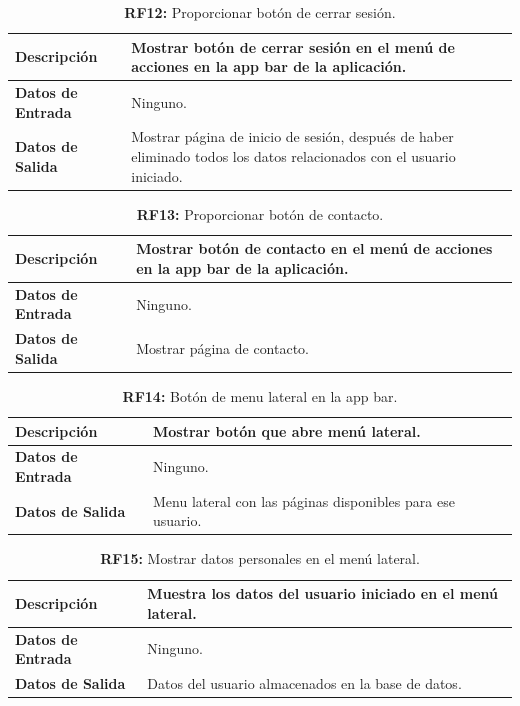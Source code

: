 \documentclass[a4paper, 12pt]{article}
\begin{document}
\begin{table}[H]
\captionsetup{justification=raggedright,singlelinecheck=false}
\caption{\textbf{RF12:} Proporcionar botón de cerrar sesión.}
\label{tab:RF12}
	\begin{tabular}{|m{5cm}|m{10cm}|}
	\hline
	\textbf{Descripción} & Mostrar botón de cerrar sesión en el menú de acciones en la app bar de la aplicación. \\ 
	\hline
	\textbf{Datos de Entrada} & Ninguno. \\ 
	\hline
	\textbf{Datos de Salida} & Mostrar página de inicio de sesión, después de haber eliminado todos los datos relacionados con el usuario iniciado. \\ 
	\hline
\end{tabular}
\end{table}

\begin{table}[H]
\captionsetup{justification=raggedright,singlelinecheck=false}
\caption{\textbf{RF13:} Proporcionar botón de contacto.}
\label{tab:RF13}
	\begin{tabular}{|m{5cm}|m{10cm}|}
	\hline
	\textbf{Descripción} & Mostrar botón de contacto en el menú de acciones en la app bar de la aplicación. \\ 
	\hline
	\textbf{Datos de Entrada} & Ninguno. \\ 
	\hline
	\textbf{Datos de Salida} & Mostrar página de contacto. \\ 
	\hline
\end{tabular}
\end{table}

\begin{table}[H]
\captionsetup{justification=raggedright,singlelinecheck=false}
\caption{\textbf{RF14:} Botón de menu lateral en la app bar.}
\label{tab:RF14}
	\begin{tabular}{|m{5cm}|m{10cm}|}
	\hline
	\textbf{Descripción} & Mostrar botón que abre menú lateral. \\ 
	\hline
	\textbf{Datos de Entrada} & Ninguno. \\ 
	\hline
	\textbf{Datos de Salida} & Menu lateral con las páginas disponibles para ese usuario. \\ 
	\hline
\end{tabular}
\end{table}

\begin{table}[H]
\captionsetup{justification=raggedright,singlelinecheck=false}
\caption{\textbf{RF15:} Mostrar datos personales en el menú lateral.}
\label{tab:RF15}
	\begin{tabular}{|m{5cm}|m{10cm}|}
	\hline
	\textbf{Descripción} & Muestra los datos del usuario iniciado en el menú lateral. \\ 
	\hline
	\textbf{Datos de Entrada} & Ninguno. \\ 
	\hline
	\textbf{Datos de Salida} & Datos del usuario almacenados en la base de datos. \\ 
	\hline
\end{tabular}
\end{table}
\end{document}
